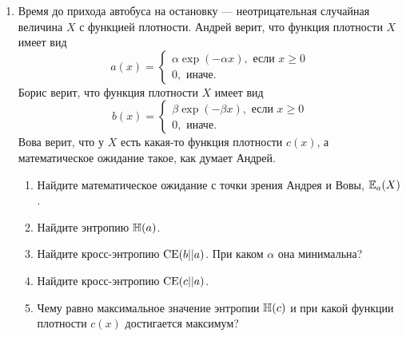 \begin{enumerate}
\item Время до прихода автобуса на остановку — неотрицательная случайная величина $X$ с функцией плотности. 
Андрей верит, что функция плотности $X$ имеет вид 
\[
a(x) = \begin{cases}
    \alpha \exp(-\alpha x), \text{ если } x \geq 0\\
    0, \text{ иначе}.
\end{cases}
\]
Борис верит, что функция плотности $X$ имеет вид 
\[
b(x) = \begin{cases}
    \beta \exp(-\beta x), \text{ если } x \geq 0\\
    0, \text{ иначе}.
\end{cases}
\]
Вова верит, что у $X$ есть какая-то функция плотности $c(x)$, а математическое ожидание такое, как думает Андрей. 
\begin{enumerate}
    \item Найдите математическое ожидание с точки зрения Андрея и Вовы, $\operatorname{\mathbb{E}}_a(X)$.
    \item Найдите энтропию $\operatorname{\mathbb{H}}(a)$. 
    \item Найдите кросс-энтропию $\operatorname{\mathrm{CE}}(b || a)$. При каком $\alpha$ она минимальна?
    \item Найдите кросс-энтропию $\operatorname{\mathrm{CE}}(c|| a)$.
    \item Чему равно максимальное значение энтропии $\operatorname{\mathbb{H}}(c)$ и при какой функции плотности $c(x)$ достигается максимум?
\end{enumerate}





\end{enumerate}
